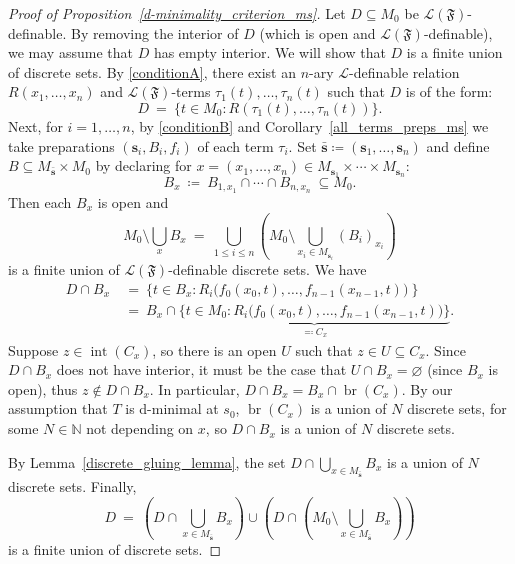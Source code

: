 \documentclass[10pt,a4paper]{amsart}
\newcommand\N{\mathbb{N}}
\newcommand\calL{\mathcal{L}}
\newcommand{\fr}{\mathfrak}
\begin{document}
\begin{proof}[Proof of Proposition~\ref{d-minimality_criterion_ms}]
Let $D\subseteq M_0$ be $\calL(\fr{F})$-definable. By removing the interior of $D$ (which is open and $\calL(\fr{F})$-definable), we may assume that $D$ has empty interior. We will show that $D$ is a finite union of discrete sets. 
By \ref{conditionA}, there exist an $n$-ary $\calL$-definable relation $R(x_1,\ldots,x_n)$ and $\calL(\fr{F})$-terms $\tau_1(t),\ldots,\tau_n(t)$ such that $D$ is of the form:
\[
D \ = \ \{t\in M_0:R(\tau_1(t),\ldots,\tau_n(t))\}.
\]
Next, for $i=1,\ldots,n$, by \ref{conditionB} and Corollary~\ref{all_terms_preps_ms} we take preparations $(\bm{s}_{i},B_{i},f_{i})$ of each term $\tau_{i}$. Set $\bar{\bm{s}}\coloneqq (\bm{s}_1,\ldots,\bm{s}_n)$ and define  $B\subseteq M_{\bar{\bm{s}}}\times M_0$ by declaring for $x=(x_1,\ldots,x_n) \in M_{\bm{s}_1}\times \cdots \times M_{\bm{s}_n}$: 
\[
B_x \ \coloneqq  \ B_{1,x_1}\cap\cdots\cap B_{n,x_n}\ \subseteq M_0.
\]
Then each $B_x$ is open and 
\[
\textstyle M_0\setminus\bigcup_{x}B_x \ = \ \bigcup_{1\leq i\leq n} (M_0 \setminus \bigcup_{x_{i}\in M_{\bm{s}_i}}(B_{i})_{x_{i}})
\]
is a finite union of $\calL(\fr{F})$-definable discrete sets.
We have 
\begin{align*}
D \cap B_x\ &= \ \{ t \in B_x : R_{i}\big(f_{0}(x_{0},t),\dots,f_{n-1}(x_{n-1},t)\big)\ \} \\
&= \ B_x\cap 
\underbrace{\{ t \in M_0 : R_{i}\big(f_{0}(x_{0},t),\dots,f_{n-1}(x_{n-1},t)\big) \}}_{\eqqcolon C_x}.
\end{align*}
Suppose $z\in\operatorname{int}(C_x)$, so there is an open $U$ such that $z\in U\subseteq C_x$. Since $D\cap B_x$ does not have interior, it must be the case that $U\cap B_x=\varnothing$ (since $B_x$ is open), thus $z\not\in D\cap B_x$. In particular, $D\cap B_x=B_x\cap \operatorname{br}(C_x)$. By our assumption that $T$ is d-minimal at $s_0$, $\operatorname{br}(C_x)$ is a union of $N$ discrete sets, for some $N \in \N$ not depending on $x$, so $D \cap B_x$ is a union of $N$ discrete sets. 

By Lemma~\ref{discrete_gluing_lemma}, the set $D \cap \bigcup_{x \in M_{\bar{\bm{s}}}} B_x$ is a union of $N$ discrete sets.
Finally,
\[
\textstyle D\ =\ (D \cap \bigcup_{x \in M_{\bar{\bm{s}}}} B_x) \cup (D \cap (M_0 \setminus \bigcup_{x \in M_{\bar{\bm{s}}}} B_x))
\]
is a finite union of discrete sets.
\end{proof}
\end{document}
